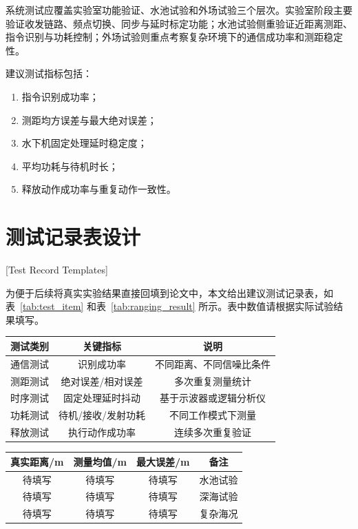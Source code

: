 系统测试应覆盖实验室功能验证、水池试验和外场试验三个层次。实验室阶段主要验证收发链路、频点切换、同步与延时标定功能；水池试验侧重验证近距离测距、指令识别与功耗控制；外场试验则重点考察复杂环境下的通信成功率和测距稳定性\cite{HuangDongYiZhongQianHaiXingShengXueYingDaShiFangQiShuiXiaDanYuanDeSheJiYuShiXian2022}。

建议测试指标包括：

\begin{enumerate}
  \item 指令识别成功率；
  \item 测距均方误差与最大绝对误差；
  \item 水下机固定处理延时稳定度；
  \item 平均功耗与待机时长；
  \item 释放动作成功率与重复动作一致性。
\end{enumerate}

\section{测试记录表设计}[Test Record Templates]

为便于后续将真实实验结果直接回填到论文中，本文给出建议测试记录表，如表~\ref{tab:test_item} 和表~\ref{tab:ranging_result} 所示。表中数值请根据实际试验结果填写。

\begin{table}[htbp]
  \vspace{0.5em}\centering\wuhao
  \begin{tabular}{ccc}
    \toprule[1.5pt]
    测试类别 & 关键指标 & 说明 \\
    \midrule[1pt]
    通信测试 & 识别成功率 & 不同距离、不同信噪比条件 \\
    测距测试 & 绝对误差/相对误差 & 多次重复测量统计 \\
    时序测试 & 固定处理延时抖动 & 基于示波器或逻辑分析仪 \\
    功耗测试 & 待机/接收/发射功耗 & 不同工作模式下测量 \\
    释放测试 & 执行动作成功率 & 连续多次重复验证 \\
    \bottomrule[1.5pt]
  \end{tabular}
\end{table}

\begin{table}[htbp]
  \vspace{0.5em}\centering\wuhao
  \begin{tabular}{cccc}
    \toprule[1.5pt]
    真实距离/m & 测量均值/m & 最大误差/m & 备注 \\
    \midrule[1pt]
    待填写 & 待填写 & 待填写 & 水池试验 \\
    待填写 & 待填写 & 待填写 & 深海试验 \\
    待填写 & 待填写 & 待填写 & 复杂海况 \\
    \bottomrule[1.5pt]
  \end{tabular}
\end{table}

